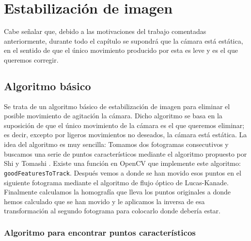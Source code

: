 \documentclass[a4paper,openright, 12pt]{book}
\begin{document}
\chapter{Estabilización de imagen}\label{cap.estab}
Cabe señalar que, debido a las motivaciones del trabajo comentadas anteriormente, durante todo el capítulo se supondrá que la cámara está estática, en el sentido de que el único movimiento producido por esta es leve y es el que queremos corregir.
\section{Algoritmo básico}
Se trata de un algoritmo básico de estabilización de imagen para eliminar el posible movimiento de agitación la cámara. Dicho algoritmo se basa en la suposición de que el único movimiento de la cámara es el que queremos eliminar; es decir, excepto por ligeros movimientos no deseados, la cámara está estática.
La idea del algoritmo es muy sencilla: 
Tomamos dos fotogramas consecutivos y buscamos una serie de puntos característicos mediante el algoritmo propuesto por Shi y Tomashi \cite{shiandtomasi}. Existe una función en OpenCV que implemente este algoritmo: \lstinline|goodFeaturesToTrack|. Después vemos a donde se han movido esos puntos en el siguiente fotograma mediante el algoritmo de flujo óptico de Lucas-Kanade\cite{LucasKanade}.
Finalmente calculamos la homografía que lleva los puntos originales a donde hemos calculado que se han movido y le aplicamos la inversa de esa transformación al segundo fotograma para colocarlo donde debería estar.
\subsection{Algoritmo para encontrar puntos característicos}
\end{document}
